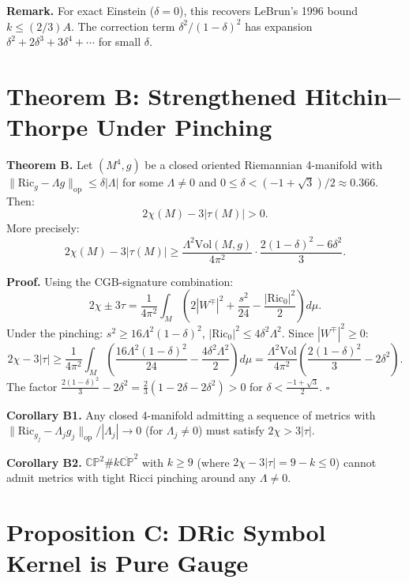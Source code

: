 \textbf{Remark.} For exact Einstein ($\delta = 0$), this recovers LeBrun's 1996 bound
$k \leq (2/3)A$. The correction term $\delta^2/(1-\delta)^2$ has expansion
$\delta^2 + 2\delta^3 + 3\delta^4 + \cdots$ for small $\delta$.


\section{Theorem B: Strengthened Hitchin--Thorpe Under Pinching}

\textbf{Theorem B.} Let $(M^4, g)$ be a closed oriented Riemannian 4-manifold with
$\|\mathrm{Ric}_g - \Lambda g\|_{\mathrm{op}} \leq \delta|\Lambda|$ for some $\Lambda \neq 0$ 
and $0 \leq \delta < (-1+\sqrt{3})/2 \approx 0.366$. Then:
\[
2\chi(M) - 3|\tau(M)| > 0.
\]
More precisely:
\[
2\chi(M) - 3|\tau(M)| \geq \frac{\Lambda^2 \mathrm{Vol}(M,g)}{4\pi^2} \cdot \frac{2(1-\delta)^2 - 6\delta^2}{3}.
\]

\textbf{Proof.} Using the CGB-signature combination:
\[
2\chi \pm 3\tau = \frac{1}{4\pi^2}\int_M\left(2|W^\mp|^2 + \frac{s^2}{24} - \frac{|\mathrm{Ric}_0|^2}{2}\right)d\mu.
\]
Under the pinching: $s^2 \geq 16\Lambda^2(1-\delta)^2$, $|\mathrm{Ric}_0|^2 \leq 4\delta^2\Lambda^2$.
Since $|W^\mp|^2 \geq 0$:
\[
2\chi - 3|\tau| \geq \frac{1}{4\pi^2}\int_M\left(\frac{16\Lambda^2(1-\delta)^2}{24} - \frac{4\delta^2\Lambda^2}{2}\right)d\mu
= \frac{\Lambda^2\mathrm{Vol}}{4\pi^2}\left(\frac{2(1-\delta)^2}{3} - 2\delta^2\right).
\]
The factor $\frac{2(1-\delta)^2}{3} - 2\delta^2 = \frac{2}{3}(1 - 2\delta - 2\delta^2) > 0$
for $\delta < \frac{-1+\sqrt{3}}{2}$. $\square$

\textbf{Corollary B1.} Any closed 4-manifold admitting a sequence of metrics with 
$\|\mathrm{Ric}_{g_j} - \Lambda_j g_j\|_{\mathrm{op}} / |\Lambda_j| \to 0$ (for $\Lambda_j \neq 0$)
must satisfy $2\chi > 3|\tau|$.

\textbf{Corollary B2.} $\mathbb{CP}^2 \# k\overline{\mathbb{CP}}^2$ with $k \geq 9$ 
(where $2\chi - 3|\tau| = 9-k \leq 0$) cannot admit metrics with tight Ricci pinching
around any $\Lambda \neq 0$.


\section{Proposition C: DRic Symbol Kernel is Pure Gauge}

